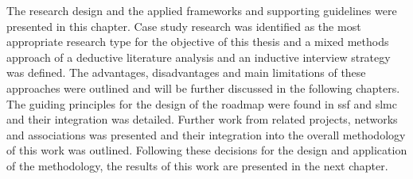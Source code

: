 The research design and the applied frameworks and supporting guidelines were presented in this chapter. Case study research was identified as the most appropriate research type for the objective of this thesis and a mixed methods approach of a deductive literature analysis and an inductive interview strategy was defined. The advantages, disadvantages and main limitations of these approaches were outlined and will be further discussed in the following chapters. The guiding principles for the design of the roadmap were found in \acrlong*{ssf} and \acrlong*{slmc} and their integration was detailed. Further work from related projects, networks and associations was presented and their integration into the overall methodology of this work was outlined. Following these decisions for the design and application of the methodology, the results of this work are presented in the next chapter.




